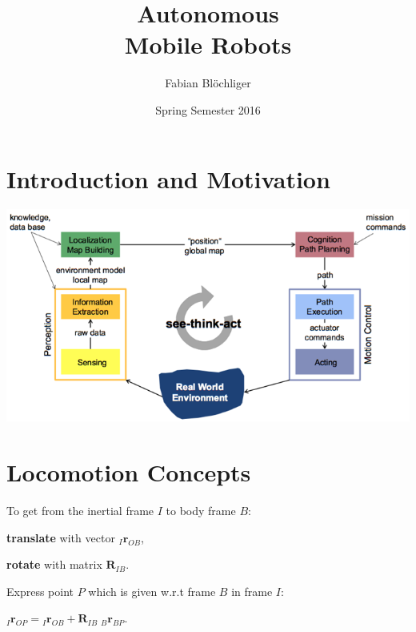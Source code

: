 \documentclass[8pt,landscape]{article}
\newcommand{\vmspace}{\vspace{-7pt}}
\newcommand{\vpspace}{\vspace{9pt}}
\begin{document}
\renewcommand{\labelitemi}{--}
\pagestyle{empty}
\raggedright
\setlength{\columnsep}{2mm}
\setlength{\columnseprule}{0.1mm}
\begin{multicols}{3}
\title{\textbf{Autonomous\\ Mobile Robots}}
\author{Fabian Blöchliger}
\date{Spring Semester 2016}
\maketitle


\section{Introduction and Motivation}

\includegraphics[width=\columnwidth]{img/1_SeeThinkAct.png}

\section{Locomotion Concepts}

\begin{minipage}{\columnwidth}
  To get from the inertial frame $I$ to body frame $B$:
  \begin{compactitem}
    \item \textbf{translate} with vector ${}_I\mathbf{r}_{OB}$,
    \item \textbf{rotate} with matrix $\mathbf{R}_{IB}$.
  \end{compactitem}
\end{minipage}

\vpspace

\begin{minipage}{\columnwidth}
  Express point $P$ which is given w.r.t frame $B$ in frame $I$:
  \vmspace
  \begin{center}
  ${}_I\mathbf{r}_{OP} = {}_I\mathbf{r}_{OB} +
  \mathbf{R}_{IB}\;{}_B\mathbf{r}_{BP}$.
  \end{center}
\end{minipage}


\end{multicols}
\end{document}
